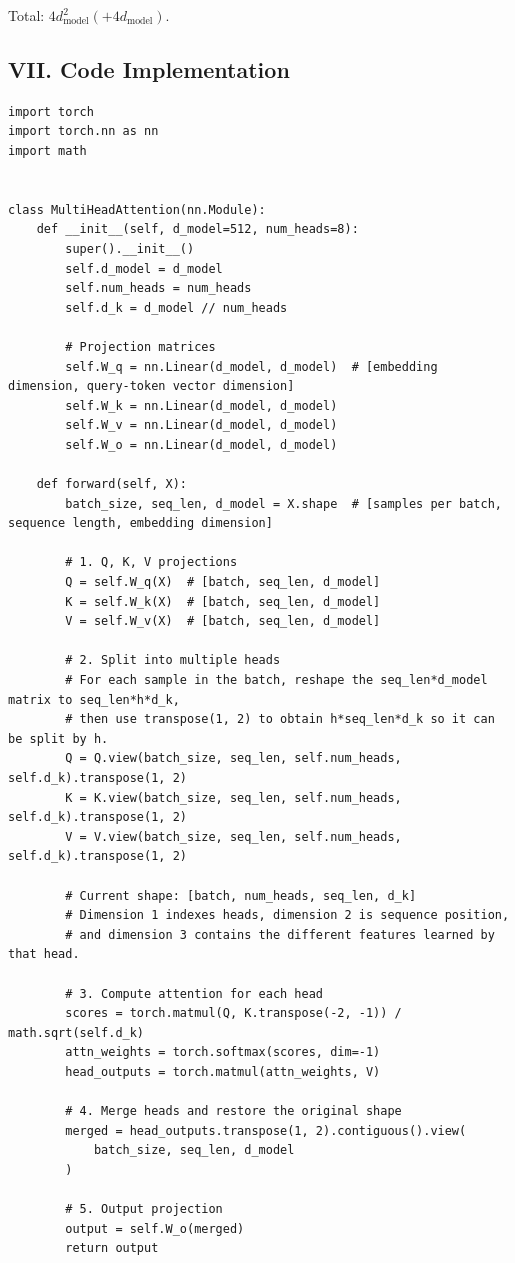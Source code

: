Total: \(4d_{\mathrm{model}}^2(+4d_{\mathrm{model}})\).

\hypertarget{vii.-code-implementation}{%
\subsection{VII. Code Implementation}\label{vii.-code-implementation}}

\begin{verbatim}
import torch
import torch.nn as nn
import math


class MultiHeadAttention(nn.Module):
    def __init__(self, d_model=512, num_heads=8):
        super().__init__()
        self.d_model = d_model
        self.num_heads = num_heads
        self.d_k = d_model // num_heads

        # Projection matrices
        self.W_q = nn.Linear(d_model, d_model)  # [embedding dimension, query-token vector dimension]
        self.W_k = nn.Linear(d_model, d_model)
        self.W_v = nn.Linear(d_model, d_model)
        self.W_o = nn.Linear(d_model, d_model)

    def forward(self, X):
        batch_size, seq_len, d_model = X.shape  # [samples per batch, sequence length, embedding dimension]

        # 1. Q, K, V projections
        Q = self.W_q(X)  # [batch, seq_len, d_model]
        K = self.W_k(X)  # [batch, seq_len, d_model]
        V = self.W_v(X)  # [batch, seq_len, d_model]

        # 2. Split into multiple heads
        # For each sample in the batch, reshape the seq_len*d_model matrix to seq_len*h*d_k,
        # then use transpose(1, 2) to obtain h*seq_len*d_k so it can be split by h.
        Q = Q.view(batch_size, seq_len, self.num_heads, self.d_k).transpose(1, 2)
        K = K.view(batch_size, seq_len, self.num_heads, self.d_k).transpose(1, 2)
        V = V.view(batch_size, seq_len, self.num_heads, self.d_k).transpose(1, 2)

        # Current shape: [batch, num_heads, seq_len, d_k]
        # Dimension 1 indexes heads, dimension 2 is sequence position,
        # and dimension 3 contains the different features learned by that head.

        # 3. Compute attention for each head
        scores = torch.matmul(Q, K.transpose(-2, -1)) / math.sqrt(self.d_k)
        attn_weights = torch.softmax(scores, dim=-1)
        head_outputs = torch.matmul(attn_weights, V)

        # 4. Merge heads and restore the original shape
        merged = head_outputs.transpose(1, 2).contiguous().view(
            batch_size, seq_len, d_model
        )

        # 5. Output projection
        output = self.W_o(merged)
        return output
\end{verbatim}

